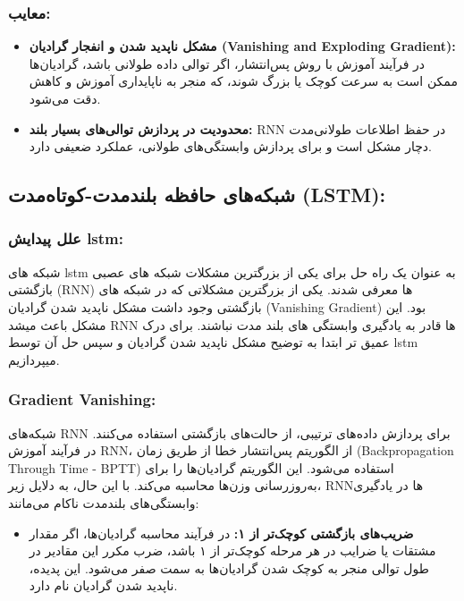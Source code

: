\subsubsection{معایب:}


\begin{itemize}
	\item \textbf{مشکل ناپدید شدن و انفجار گرادیان (Vanishing and Exploding Gradient):} در فرآیند آموزش با روش پس‌انتشار، اگر توالی داده طولانی باشد، گرادیان‌ها ممکن است به سرعت کوچک یا بزرگ شوند، که منجر به ناپایداری آموزش و کاهش دقت می‌شود.
	
	\item \textbf{محدودیت در پردازش توالی‌های بسیار بلند:} RNN در حفظ اطلاعات طولانی‌مدت دچار مشکل است و برای پردازش وابستگی‌های طولانی، عملکرد ضعیفی دارد.
	
\end{itemize}

\subsection{شبکه‌های حافظه بلندمدت-کوتاه‌مدت (LSTM):}

\subsubsection{علل پیدایش lstm:}
شبکه های lstm  به عنوان یک راه حل برای یکی از بزرگترین مشکلات شبکه های عصبی بازگشتی (RNN) ها معرفی شدند.
یکی از بزرگترین مشکلاتی که در شبکه های بازگشتی وجود داشت مشکل ناپدید شدن گرادیان (Vanishing Gradient) بود. این مشکل باعث میشد RNN  ها قادر به یادگیری وابستگی های بلند مدت نباشند. برای درک عمیق تر ابتدا به توضیح مشکل ناپدید شدن گرادیان و سپس حل آن توسط lstm میپردازیم.

\subsubsection{ Gradient Vanishing:}


شبکه‌های RNN برای پردازش داده‌های ترتیبی، از حالت‌های بازگشتی استفاده می‌کنند. در فرآیند آموزش RNN، از الگوریتم پس‌انتشار خطا از طریق زمان (Backpropagation Through Time - BPTT) استفاده می‌شود. این الگوریتم گرادیان‌ها را برای به‌روزرسانی وزن‌ها محاسبه می‌کند. با این حال، به دلایل زیر، RNNها در یادگیری وابستگی‌های بلندمدت ناکام می‌مانند:

\begin{itemize}
	\item \textbf{ضریب‌های بازگشتی کوچک‌تر از ۱:} در فرآیند محاسبه گرادیان‌ها، اگر مقدار مشتقات یا ضرایب در هر مرحله کوچک‌تر از ۱ باشد، ضرب مکرر این مقادیر در طول توالی منجر به کوچک شدن گرادیان‌ها به سمت صفر می‌شود. این پدیده، ناپدید شدن گرادیان نام دارد.
\end{itemize}

